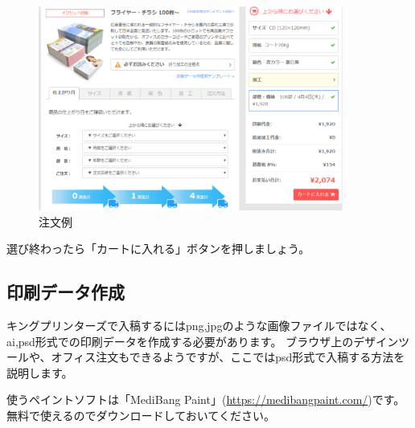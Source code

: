 \documentclass[11pt,a4paper]{jsarticle}
\begin{document}
                \begin{figure}[htbp]
                    \begin{center}
                    \includegraphics[width=10.0cm]{./image/kinpri01.eps}
                    \caption{注文例}
                    \label{fig:kinpri01}
                    \end{center}
                \end{figure}

                選び終わったら「カートに入れる」ボタンを押しましょう。
            
            \subsection{印刷データ作成}
                キングプリンターズで入稿するにはpng,jpgのような画像ファイルではなく、ai,psd形式での印刷データを作成する必要があります。
                ブラウザ上のデザインツールや、オフィス注文もできるようですが、ここではpsd形式で入稿する方法を説明します。

                使うペイントソフトは「MediBang Paint」(\url{https://medibangpaint.com/})です。無料で使えるのでダウンロードしておいてください。
\end{document}
